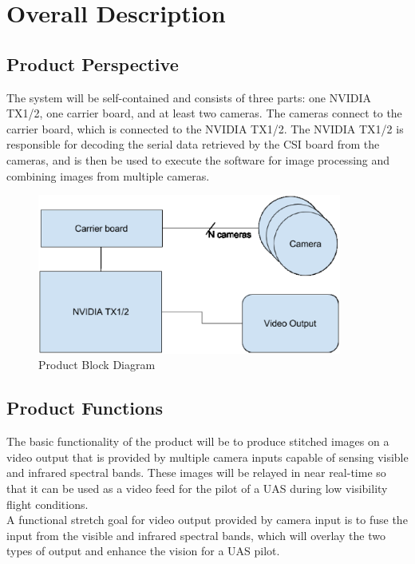 \documentclass[letterpaper,10pt,serif,draftclsnofoot,onecolumn,compsoc,titlepage]{IEEEtran}
\begin{document}
\section{Overall Description}

\subsection{Product Perspective}

The system will be self-contained and consists of three parts: one NVIDIA TX1/2, 
one carrier board, and at least two cameras. The cameras connect to the carrier board, 
which is connected to the NVIDIA TX1/2. The NVIDIA TX1/2 is responsible for decoding 
the serial data retrieved by the CSI board from the cameras, and is then be used to 
execute the software for image processing and combining images from multiple cameras.\\

\begin{figure}[H]
	\centering
	\label{fig:ProductBlockDiagram}
	\includegraphics[width=10cm]{images/diagram.eps}
	\caption{Product Block Diagram \label{overflow}}
\end{figure}

\subsection{Product Functions}

The basic functionality of the product will be to produce stitched images on a video 
output that is provided by multiple camera inputs capable of sensing visible and 
infrared spectral bands. These images will be relayed in near real-time so that it 
can be used as a video feed for the pilot of a UAS during low visibility flight 
conditions. \\

A functional stretch goal for video output provided by camera input is to fuse the 
input from the visible and infrared spectral bands, which will overlay the two types of output 
and enhance the vision for a UAS pilot. \\
\end{document}
